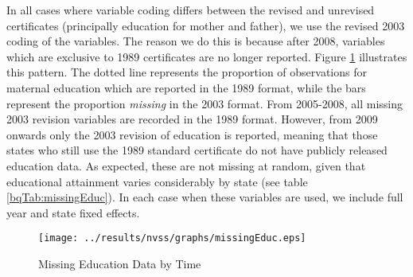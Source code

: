 \documentclass[a4paper, 11 pt]{article}
\theoremstyle{plain}
\begin{document}
\begin{spacing}{1.2}
In all cases where variable coding differs between the revised and unrevised
certificates (principally education for mother and father), we use the revised
2003 coding of the variables.  The reason we do this is because after 2008,
variables which are exclusive to 1989 certificates are no longer reported.
Figure \ref{bqFig:educMissing} illustrates this pattern.  The dotted line 
represents the proportion of observations for maternal education which are
reported in the 1989 format, while the bars represent the proportion 
\emph{missing} in the 2003 format.  From 2005-2008, all missing 2003 revision
variables are recorded in the 1989 format.  However, from 2009 onwards only
the 2003 revision of education is reported, meaning that those states who
still use the 1989 standard certificate do not have publicly released education
data.  As expected, these are not missing at random, given that educational
attainment varies considerably by state (see table \ref{bqTab:missingEduc}).
In each case when these variables are used, we include full year and state
fixed effects.  
\begin{figure}[htpb!]
\caption{Missing Education Data by Time}
\label{bqFig:educMissing}
\texttt{[image: ../results/nvss/graphs/missingEduc.eps]}
\end{figure}



\end{spacing}
\end{document}
